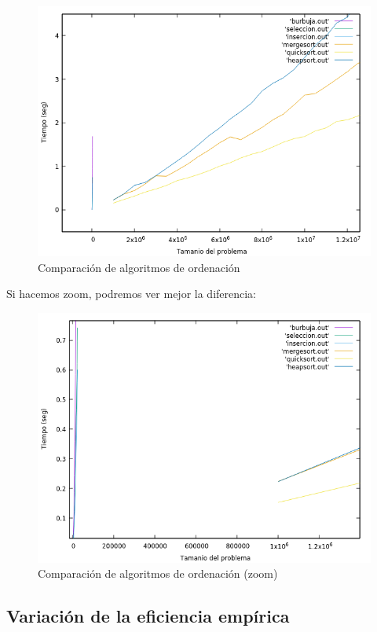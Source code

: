 \documentclass[12pt,spanish]{article}
\begin{document}
\begin{figure}[H]
\centering
\includegraphics[scale=0.75]{empirica_ordenacion_comparacion.png}
\caption{Comparación de algoritmos de ordenación}
\end{figure}

Si hacemos zoom, podremos ver mejor la diferencia:

\begin{figure}[H]
\centering
\includegraphics[scale=0.75]{empirica_ordenacion_comparacion_zoom.png}
\caption{Comparación de algoritmos de ordenación (zoom)}
\end{figure}
\subsection{Variación de la eficiencia empírica}
\label{sec:variacion}
\end{document}
